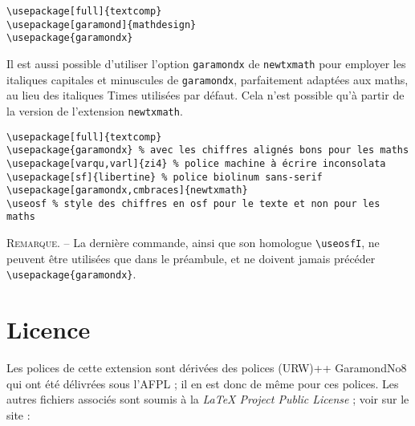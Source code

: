 \documentclass[12pt,english,french]{article}
\begin{document}
\begin{verbatim}
\usepackage[full]{textcomp}
\usepackage[garamond]{mathdesign}
\usepackage{garamondx}
\end{verbatim}

Il est aussi possible d'utiliser l'option \texttt{garamondx} de \texttt{newtxmath} pour employer les italiques capitales et minuscules de \texttt{garamondx}, parfaitement adaptées aux maths, au lieu des italiques Times utilisées par défaut. Cela n'est possible qu'à partir de la version  de l'extension \texttt{newtxmath}.

\begin{verbatim}
\usepackage[full]{textcomp}
\usepackage{garamondx} % avec les chiffres alignés bons pour les maths
\usepackage[varqu,varl]{zi4} % police machine à écrire inconsolata
\usepackage[sf]{libertine} % police biolinum sans-serif
\usepackage[garamondx,cmbraces]{newtxmath}
\useosf % style des chiffres en osf pour le texte et non pour les maths
\end{verbatim}

\noindent\textsc{Remarque}. -- La dernière commande, ainsi que son homologue \verb+\useosfI+, ne peuvent être utilisées que dans le préambule, et ne doivent jamais précéder \verb+\usepackage{garamondx}+.

\section{Licence}

%  


Les polices de cette extension sont dérivées des polices (URW)++ GaramondNo8 qui ont été délivrées sous l'AFPL ;  il en est donc de même pour ces polices. Les autres fichiers associés sont soumis à la \emph{\LaTeX{} Project Public License} ; voir sur le site :
\end{document}
